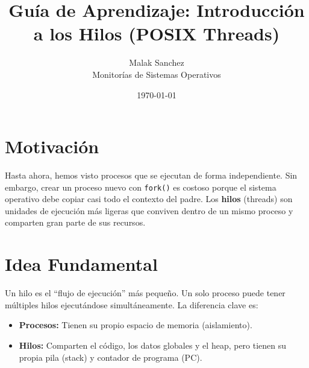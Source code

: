 \documentclass[12pt,a4paper]{article}
\title{\textbf{Guía de Aprendizaje: Introducción a los Hilos (POSIX Threads)}}
\author{Malak Sanchez \\ \small Monitorías de Sistemas Operativos}
\date{\today}
\begin{document}
\maketitle

\section{Motivación}
Hasta ahora, hemos visto procesos que se ejecutan de forma independiente. Sin embargo, crear un proceso nuevo con \texttt{fork()} es costoso porque el sistema operativo debe copiar casi todo el contexto del padre. Los \textbf{hilos} (threads) son unidades de ejecución más ligeras que conviven dentro de un mismo proceso y comparten gran parte de sus recursos.

\section{Idea Fundamental}
Un hilo es el ``flujo de ejecución''  más pequeño. Un solo proceso puede tener múltiples hilos ejecutándose simultáneamente. La diferencia clave es:
\begin{itemize}
    \item \textbf{Procesos:} Tienen su propio espacio de memoria (aislamiento).
    \item \textbf{Hilos:} Comparten el código, los datos globales y el heap, pero tienen su propia pila (stack) y contador de programa (PC).
\end{itemize}

\begin{center}
\end{center}
\end{document}
